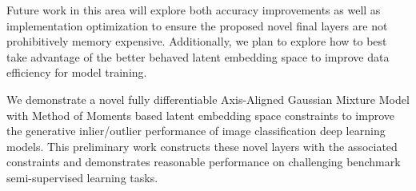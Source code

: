 \documentclass[10pt,twocolumn,letterpaper]{article}
\begin{document}
Future work in this area will explore both accuracy improvements as well as implementation optimization to ensure the proposed novel final layers are not prohibitively memory expensive.
Additionally, we plan to explore how to best take advantage of the better behaved latent embedding space to improve data efficiency for model training. 

We demonstrate a novel fully differentiable Axis-Aligned Gaussian Mixture Model with Method of Moments based latent embedding space constraints to improve the generative inlier/outlier performance of image classification deep learning models. 
This preliminary work constructs these novel layers with the associated constraints and demonstrates reasonable performance on challenging benchmark semi-supervised learning tasks.



{
	\small
	
	
}
\end{document}
